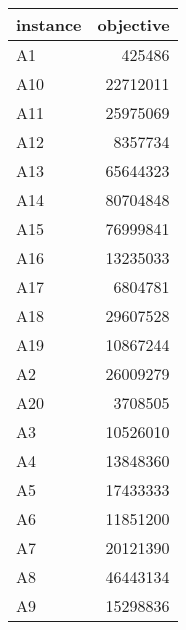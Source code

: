 \begin{tabular}{lr}
\toprule
instance &  objective \\
\midrule
      A1 &     425486 \\
     A10 &   22712011 \\
     A11 &   25975069 \\
     A12 &    8357734 \\
     A13 &   65644323 \\
     A14 &   80704848 \\
     A15 &   76999841 \\
     A16 &   13235033 \\
     A17 &    6804781 \\
     A18 &   29607528 \\
     A19 &   10867244 \\
      A2 &   26009279 \\
     A20 &    3708505 \\
      A3 &   10526010 \\
      A4 &   13848360 \\
      A5 &   17433333 \\
      A6 &   11851200 \\
      A7 &   20121390 \\
      A8 &   46443134 \\
      A9 &   15298836 \\
\bottomrule
\end{tabular}
